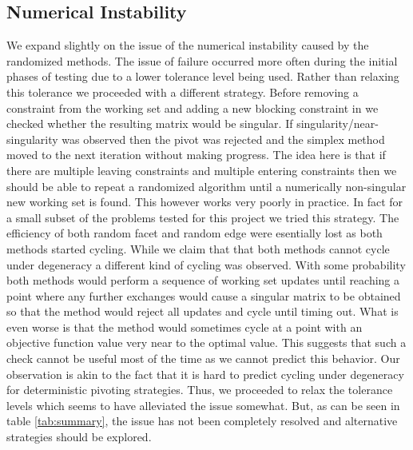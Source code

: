 \documentclass{standalone}
\begin{document}
  \subsection{Numerical Instability}
  We expand slightly on the issue of the numerical instability caused by the randomized methods. The issue of failure occurred more often during the initial phases of testing due to a lower tolerance level being used. Rather than relaxing this tolerance we proceeded with a different strategy. Before removing a constraint from the working set and adding a new blocking constraint in we checked whether the resulting matrix would be singular. If singularity/near-singularity was observed then the pivot was rejected and the simplex method moved to the next iteration without making progress. The idea here is that if there are multiple leaving constraints and multiple entering constraints then we should be able to repeat a randomized algorithm until a numerically non-singular new working set is found. This however works very poorly in practice. In fact for a small subset of the problems tested for this project we tried this strategy. The efficiency of both random facet and random edge were esentially lost as both methods started cycling. While we claim that that both methods cannot cycle under degeneracy a different kind of cycling was observed. With some probability both methods would perform a sequence of working set updates until reaching a point where any further exchanges would cause a singular matrix to be obtained so that the method would reject all updates and cycle until timing out. What is even worse is that the method would sometimes cycle at a point with an objective function value very near to the optimal value. This suggests that such a check cannot be useful most of the time as we cannot predict this behavior. Our observation is akin to the fact that it is hard to predict cycling under degeneracy for deterministic pivoting strategies. Thus, we proceeded to relax the tolerance levels which seems to have alleviated the issue somewhat. But, as can be seen in table \ref{tab:summary}, the issue has not been completely resolved and alternative strategies should be explored. 
\end{document}
